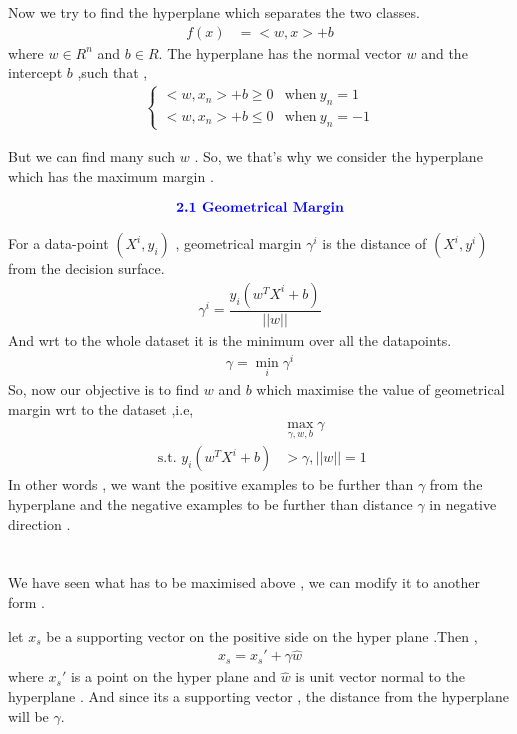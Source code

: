 \documentclass[12pt,a4paper]{article}
\begin{document}
{Now we try to find the hyperplane which separates the two classes.
\begin{align*}
    f(x) &= < w,x > + b
\end{align*}
where $w \in R^n$ and $b\in R$. The hyperplane has the normal vector $w$ and the intercept $b$ ,such that ,
\begin{align*}
    \begin{cases}
        < w,x_n > + b \ge 0 & \text{when} \ y_n=1\\
        < w,x_n > + b \le 0 & \text{when} \ y_n=-1
    \end{cases}
\end{align*}

But we can find many such $w$ . So, we that's why we consider the hyperplane which has the maximum margin .

\begin{align*}
    \textcolor{blue}{\text{{\textbf{2.1 Geometrical Margin}}}}
\end{align*}

For a data-point $(X^i,y_i)$ , geometrical margin $\gamma^i$ is the distance of $(X^i,y^i)$ from the decision surface.
\begin{align*}
    \gamma^i = \dfrac{y_i(w^{T}X^i + b)}{||w||}
\end{align*}
And wrt to the whole dataset it is the minimum over all the datapoints.
\begin{align*}
    \gamma = \min_{i}\gamma^i
\end{align*}
So, now our objective is to find $w$ and $b$ which maximise the value of geometrical margin wrt to the dataset ,i.e,
\begin{align*}
    &\max_{\gamma,w,b} \gamma \\ 
    \text{    s.t.   }  y_i(w^{T}X^i + b) &> \gamma  , ||w|| = 1
\end{align*}
In other words , we want the positive examples to be further than $\gamma$ from the hyperplane and the negative examples to be further than distance $\gamma$ in negative direction .





\section{}
We have seen what has to be maximised above , we can modify it to another form .

let $x_s$ be a supporting vector on the positive side on the hyper plane .Then ,
\begin{align*}
    x_s = x_s' + \gamma \hat{w}
\end{align*}
where $x_s'$ is a point on the hyper plane and $\hat{w}$ is unit vector normal to the hyperplane . And since its a supporting vector , the distance from the hyperplane will be $\gamma$.

}
\end{document}
